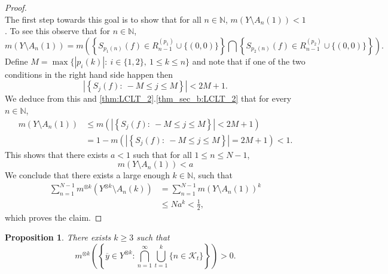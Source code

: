 \documentclass[12pt,reqno]{amsart}
\newcommand{\N}{\mathbb{N}}
\newcommand{\kay}{\mathcal{K}}
\newtheorem{prop}[thm]{Proposition}
\theoremstyle{definition}
\begin{document}
\begin{proof}
\[\]
The first step towards this goal is to show that for all $n\in \N$, $m(Y\setminus A_n(1)) < 1$. To see this observe that for $n \in \N$, 
\begin{equation}\label{eq: ooooffff}
m(Y\setminus A_n(1)) = m \left(\left\{S_{p_1(n)}(f)\in R_{n-1}^{\left(p_1\right)}\cup \{(0,0)\}\right\}\bigcap \left\{S_{p_2(n)}(f)\in R_{n-1}^{\left(p_2\right)}\cup\{(0,0)\}\right\}\right). 
\end{equation}
Define $M=\max\{\left|p_i(k)\right|:\ i\in\{1,2\},\ 1\leq k\leq n\}$ and note that if one of the two conditions in the right hand side happen then 
\[
\left|\left\{S_j(f):\ -M\leq j\leq M\right\}\right|<2M+1.
\]
We deduce from this and \cref{thm:LCLT_2}.\ref{thm_sec_b:LCLT_2} that for every $n \in \N$,
\begin{align*}
m(Y\setminus A_n(1))&\leq m\left(\left|\left\{S_j(f):\ -M\leq j\leq M\right\}\right|<2M+1\right)\\
&=1-m\left(\left|\left\{S_j(f):\ -M\leq j\leq M\right\}\right|=2M+1\right)<1.
\end{align*}
This shows that  there exists $a<1$ such that for all $1\leq n\leq N-1$, 
\[
m(Y\setminus A_n(1)) < a
\]
We conclude that there exists a large enough $k \in \N$, such that
\begin{align*}
\sum_{n=1}^{N-1} m^{\otimes k}(Y^{\otimes k} \setminus A_n(k))&=\sum_{n=1}^{N-1} m(Y \setminus A_n(1))^k\\
&\leq Na^k< \frac{1}{2},
\end{align*}
which proves the claim. 
\end{proof}

\begin{prop}\label{prop:m^k(barC)>0}
There exists $k\geq 3$ such that
\[
m^{\otimes k} \left(\left\{\overline{y} \in Y^{\otimes k} : \bigcap_{n=1}^{\infty} \bigcup_{t=1}^k \{n \in \kay_t\}\right\}\right) >0.
\]   
\end{prop} 
\end{document}
